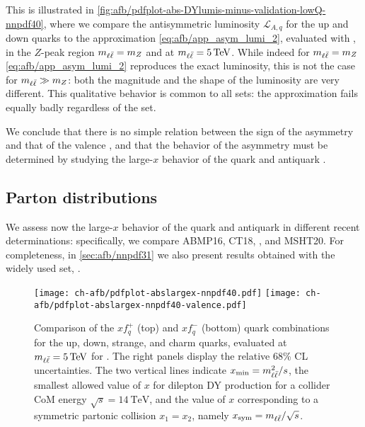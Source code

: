 This is illustrated in
\cref{fig:afb/pdfplot-abs-DYlumis-minus-validation-lowQ-nnpdf40}, where we
compare the antisymmetric luminosity $\mathcal{L}_{A,q}$ for the up and down
quarks  to the approximation \cref{eq:afb/app_asym_lumi_2}, evaluated with
 \nnlo, in the $Z$-peak region $m_{\ell\bar{\ell}}=m_Z$  and at
$\mll=\SI{5}{\tera\electronvolt}$.
%
While indeed for $m_{\ell\bar{\ell}}=m_Z$ \cref{eq:afb/app_asym_lumi_2} reproduces the exact
luminosity, this is not the case for $m_{\ell\bar{\ell}}\gg m_Z$: both the magnitude and the
shape of the luminosity are  very different.
%
This qualitative behavior is common to all \pdf sets: the approximation fails
equally badly regardless of the \pdf set.

We conclude that there is no simple relation between the sign of the asymmetry
and that of the valence \pdf, and that the behavior of the asymmetry must be
determined by studying the large-$x$ behavior of the quark and antiquark \pdfs.

\subsection{Parton distributions}
\label{sec:afb/subsec-largexPDFs}

We assess now the large-$x$ behavior of the quark and antiquark \pdfs in
different recent \pdf determinations: specifically, we compare ABMP16, CT18, 
, and MSHT20.
%
For completeness, in \cref{sec:afb/nnpdf31} we also present results obtained
with the widely used  set, \cite{Ball:2017nwa}.

\begin{figure}[!t]
  \centering
  \texttt{[image: ch-afb/pdfplot-abslargex-nnpdf40.pdf]}
  \texttt{[image: ch-afb/pdfplot-abslargex-nnpdf40-valence.pdf]}
  \caption{\small
    Comparison of the $xf^+_q$ (top) and $xf_q^-$ (bottom) quark \pdf
    combinations for the up, down, strange, and charm quarks, evaluated at
    $\mll=\SI{5}{\tera\electronvolt}$ for  \nnlo.
    The right panels display the relative 68\% CL uncertainties.
    The two vertical lines indicate $x_{\text{min}}=m_{\ell\bar{\ell}}^2/s$, the smallest
    allowed value of $x$  for dilepton DY production for a collider CoM energy
    $\sqrt{s}=\SI{14}{\tera\electronvolt}$, and the value of $x$ corresponding
    to a symmetric partonic collision $x_1=x_2$, namely
    $x_{\text{sym}}=m_{\ell\bar{\ell}}/\sqrt{s}$.
  }    
  \label{fig:afb/pdfplot-abslargex}
\end{figure}

